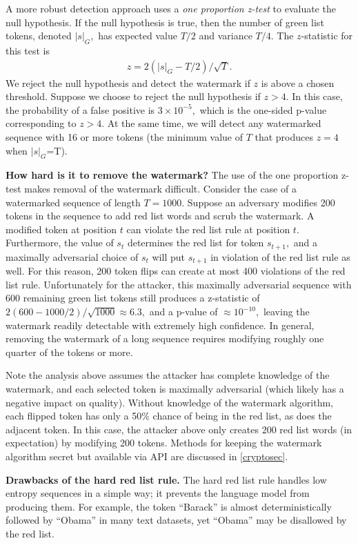 \documentclass{article}
\theoremstyle{plain}
\theoremstyle{definition}
\theoremstyle{remark}
\begin{document}
A more robust detection approach uses a {\em one proportion z-test} to evaluate the null hypothesis. If the null hypothesis is true, then the number of green list tokens, denoted $|s|_G,$ has expected value $T/2$ and variance $T/4.$ The $z$-statistic for this test is  
\begin{align} \label{zformula}
z = 2(|s|_G - T/2)/\sqrt{T}.
\end{align}
We reject the null hypothesis and detect the watermark if $z$ is above a chosen threshold. Suppose we choose to reject the null hypothesis if $z>4.$  In this case, the probability of a false positive is $3\times 10^{-5},$ which is the one-sided p-value corresponding to $z>4.$ At the same time, we will detect any watermarked sequence with 16 or more tokens (the minimum value of $T$ that produces $z=4$ when $|s|_G$=T).

\textbf{How hard is it to remove the watermark?} \label{remove}
The use of the one proportion z-test makes removal of the watermark difficult.  Consider the case of a watermarked sequence of length $T=1000$. Suppose an adversary modifies 200 tokens in the sequence to add red list words and scrub the watermark. A modified token at position $t$ can violate the red list rule at position $t$.  Furthermore, the value of $s_t$ determines the red list for token $s_{t+1},$ and a maximally adversarial choice of $s_t$ will put $s_{t+1}$ in violation of the red list rule as well.  For this reason, 200 token flips can create at most 400 violations of the red list rule.  Unfortunately for the attacker, this maximally adversarial sequence with 600 remaining green list tokens still produces a z-statistic of $2(600-1000/2)/\sqrt{1000} \approx 6.3,$ and a p-value of $\approx 10^{-10},$ leaving the watermark readily detectable with extremely high confidence. In general, removing the watermark of a long sequence requires modifying roughly one quarter of the tokens or more. 

 Note the analysis above assumes the attacker has complete knowledge of the watermark, and each selected token is maximally adversarial (which likely has a negative impact on quality). Without knowledge of the watermark algorithm, each flipped token has only a 50\% chance of being in the red list, as does the adjacent token.  In this case, the attacker above only creates 200 red list words (in expectation) by modifying 200 tokens.  Methods for keeping the watermark algorithm secret but available via API are discussed in \cref{cryptosec}.

\textbf{Drawbacks of the hard red list rule.}
The hard red list rule handles low entropy sequences in a simple way; it prevents the language model from producing them. For example, the token ``Barack'' is almost deterministically followed by ``Obama'' in many text datasets, yet ``Obama'' may be disallowed by the red list.
\end{document}
